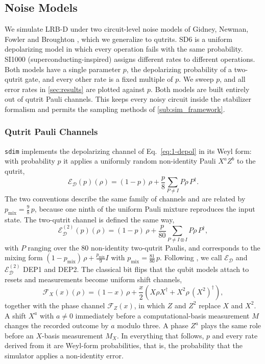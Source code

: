\subsection{Noise Models}
\label{sub:noise_models}

We simulate LRB-D under two circuit-level noise models of Gidney, Newman, Fowler and Broughton \cite{GidneyHoneycomb2021}, which we generalize to qutrits. SD6 is a uniform depolarizing model in which every operation fails with the same probability. SI1000 (superconducting-inspired) assigns different rates to different operations. Both models have a single parameter $p$, the depolarizing probability of a two-qutrit gate, and every other rate is a fixed multiple of $p$. We sweep $p$, and all error rates in \autoref{sec:results} are plotted against $p$. Both models are built entirely out of qutrit Pauli channels. This keeps every noisy circuit inside the stabilizer formalism and permits the sampling methods of \autoref{sub:sim_framework}.

\subsubsection{Qutrit Pauli Channels}

\texttt{sdim} implements the depolarizing channel of Eq.~\eqref{eq:1-depol} in its Weyl form: with probability $p$ it applies a uniformly random non-identity Pauli $X^a Z^b$ to the qutrit,
\begin{equation}
    \mathcal{E}_{\mathcal{D}}(p)(\rho) = (1-p)\,\rho + \frac{p}{8}\sum_{P \neq I} P \rho\, P^\dagger .
\end{equation}
The two conventions describe the same family of channels and are related by $p_{\mathrm{mix}} = \tfrac{9}{8}\,p$, because one ninth of the uniform Pauli mixture reproduces the input state. The two-qutrit channel is defined the same way,
\begin{equation}
    \mathcal{E}^{(2)}_{\mathcal{D}}(p)(\rho) = (1-p)\,\rho + \frac{p}{80}\sum_{P \neq I \otimes I} P \rho\, P^\dagger,
    \label{eq:2-depol}
\end{equation}
with $P$ ranging over the $80$ non-identity two-qutrit Paulis, and corresponds to the mixing form $(1-p_{\mathrm{mix}})\,\rho + \tfrac{p_{\mathrm{mix}}}{9} I$ with $p_{\mathrm{mix}} = \tfrac{81}{80}\,p$. Following \cite{GidneyHoneycomb2021}, we call $\mathcal{E}_{\mathcal{D}}$ and $\mathcal{E}^{(2)}_{\mathcal{D}}$ DEP1 and DEP2. The classical bit flips that the qubit models attach to resets and measurements become uniform shift channels,
\begin{equation}
    \mathcal{F}_X(x)(\rho) = (1-x)\,\rho + \frac{x}{2}\left( X \rho X^\dagger + X^2 \rho\, (X^2)^\dagger \right),
    \label{eq:flip-channel}
\end{equation}
together with the phase channel $\mathcal{F}_Z(x)$, in which $Z$ and $Z^2$ replace $X$ and $X^2$. A shift $X^a$ with $a \neq 0$ immediately before a computational-basis measurement $M$ changes the recorded outcome by $a$ modulo three. A phase $Z^a$ plays the same role before an $X$-basis measurement $M_X$. In everything that follows, $p$ and every rate derived from it are Weyl-form probabilities, that is, the probability that the simulator applies a non-identity error.

